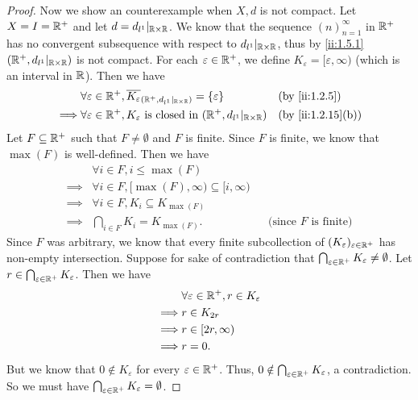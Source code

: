\begin{proof}
  Now we show an counterexample when \(X, d\) is not compact.
  Let \(X = I = \mathbb{R}^+\) and let \(d = d_{l^1}|_{\mathbb{R} \times \mathbb{R}}\).
  We know that the sequence \((n)_{n = 1}^\infty\) in \(\mathbb{R}^+\) has no convergent subsequence with respect to \(d_{l^1}|_{\mathbb{R} \times \mathbb{R}}\), thus by \cref{ii:1.5.1} \((\mathbb{R}^+, d_{l^1}|_{\mathbb{R} \times \mathbb{R}})\) is not compact.
  For each \(\varepsilon \in \mathbb{R}^+\), we define \(K_\varepsilon = [\varepsilon, \infty)\) (which is an interval in \(\mathbb{R}\)).
  Then we have
  \begin{align*}
             & \forall \varepsilon \in \R^+, \overline{K_\varepsilon}_{(\R^+, d_{l^1}|_{\R \times \R})} = \set{\varepsilon} &  & \by{ii:1.2.5}     \\
    \implies & \forall \varepsilon \in \R^+, K_\varepsilon \text{ is closed in } (\R^+, d_{l^1}|_{\R \times \R})            &  & \by{ii:1.2.15}[b]
  \end{align*}
  Let \(F \subseteq \mathbb{R}^+\) such that \(F \neq \emptyset\) and \(F\) is finite.
  Since \(F\) is finite, we know that \(\max(F)\) is well-defined.
  Then we have
  \begin{align*}
             & \forall i \in F, i \leq \max(F)                                                              \\
    \implies & \forall i \in F, [\max(F), \infty) \subseteq [i, \infty)                                     \\
    \implies & \forall i \in F, K_i \subseteq K_{\max(F)}                                                   \\
    \implies & \bigcap_{i \in F} K_i = K_{\max(F)}.                     &  & \text{(since \(F\) is finite)}
  \end{align*}
  Since \(F\) was arbitrary, we know that every finite subcollection of \((K_\varepsilon)_{\varepsilon \in \mathbb{R}^+}\) has non-empty intersection.
  Suppose for sake of contradiction that \(\bigcap_{\varepsilon \in \mathbb{R}^+} K_\varepsilon \neq \emptyset\).
  Let \(r \in \bigcap_{\varepsilon \in \mathbb{R}^+} K_\varepsilon\).
  Then we have
  \begin{align*}
             & \forall \varepsilon \in \mathbb{R}^+, r \in K_\varepsilon \\
    \implies & r \in K_{2r}                                      \\
    \implies & r \in [2r, \infty)                                \\
    \implies & r = 0.
  \end{align*}
  But we know that \(0 \notin K_\varepsilon\) for every \(\varepsilon \in \mathbb{R}^+\).
  Thus, \(0 \notin \bigcap_{\varepsilon \in \mathbb{R}^+} K_\varepsilon\), a contradiction.
  So we must have \(\bigcap_{\varepsilon \in \mathbb{R}^+} K_\varepsilon = \emptyset\).
\end{proof}
